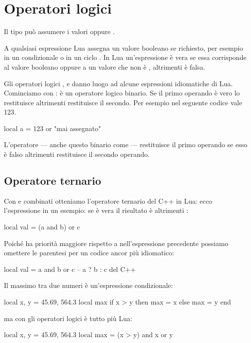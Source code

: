 

\chapter{Operatori logici}
\label{chFondOpLogic}

Il tipo  può assumere i valori 
oppure .

A qualsiasi espressione Lua assegna un valore booleano se richiesto, per esempio
in un condizionale  o in un ciclo . In
Lua un'espressione è vera se essa corrisponde al valore booleano
 oppure a un valore che non è ,
altrimenti è falsa.

Gli operatori logici ,  e
 danno luogo ad alcune espressioni idiomatiche di Lua.
Cominciamo con : è un operatore logico binario. Se il primo operando è
vero lo restituisce altrimenti restituisce il secondo. Per esempio nel seguente
codice  vale 123.
\begin{lines}
local a = 123 or "mai assegnato"
\end{lines}

L'operatore  --- anche questo binario come  --- restituisce il
primo operando se esso è falso altrimenti restituisce il secondo operando.

\section{Operatore ternario}
\label{secFondOperatoreTernario}

Con  e  combinati otteniamo l'operatore ternario del C++ in
Lua: ecco l'espressione in un esempio: se  è vera il risultato è 
altrimenti :
\begin{lines}
local val = (a and b) or c
\end{lines}

Poiché  ha priorità maggiore rispetto a  nell'espressione
precedente possiamo omettere le parentesi per un codice ancor più idiomatico:
\begin{lines}
local val = a and b or c -- a ? b : c del C++
\end{lines}

Il massimo tra due numeri è un'espressione condizionale:
\begin{lines}
local x, y = 45.69, 564.3
local max
if x > y then
    max = x
else
    max = y
end
\end{lines}
ma con gli operatori logici è tutto più Lua:
\begin{lines}
local x, y = 45.69, 564.3
local max = (x > y) and x or y
\end{lines}

